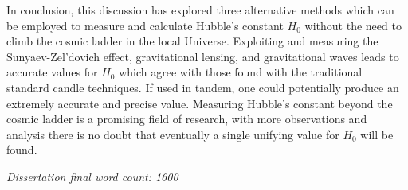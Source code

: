 \documentclass[12pt, onecolumn]{revtex4}    %
\begin{document}
In conclusion, this discussion has explored three alternative methods which can be employed to measure and calculate Hubble's constant $H_0$ without the need to climb the cosmic ladder in the local Universe. Exploiting and measuring the Sunyaev-Zel'dovich effect, gravitational lensing, and gravitational waves leads to accurate values for $H_0$ which agree with those found with the traditional standard candle techniques. If used in tandem, one could potentially produce an extremely accurate and precise value. Measuring Hubble's constant beyond the cosmic ladder is a promising field of research, with more observations and analysis there is no doubt that eventually a single unifying value for $H_0$ will be found. \\ 

\newpage

\textit{Dissertation final word count: 1600}





\newpage
\end{document}
